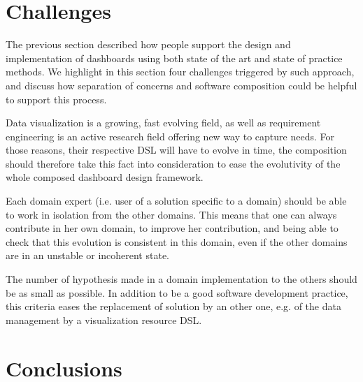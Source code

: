 \documentclass{acm_proc_article-sp}
\begin{document}
\section{Challenges}

The previous section described how people support the design and
implementation of dashboards using both state of the art and state of
practice methods. We highlight in this section four challenges
triggered by such approach, and discuss how separation of concerns and
software composition could be helpful to support this process.


Data visualization is a growing, fast evolving field, as well as
requirement engineering is an active research field offering new way
to capture needs.  For those reasons, their respective DSL will have
to evolve in time, the composition should therefore take this fact
into consideration to ease the evolutivity of the whole composed
dashboard design framework.

Each domain expert (i.e. user of a solution specific to a domain)
should be able to work in isolation from the other domains. This means
that one can always contribute in her own domain, to improve her
contribution, and being able to check that this evolution is
consistent in this domain, even if the other domains are in an
unstable or incoherent state.

The number of hypothesis made in a domain implementation to the others
should be as small as possible. In addition to be a good software
development practice, this criteria eases the replacement of solution
by an other one, e.g. of the data management by a visualization
resource DSL.


\section{Conclusions}

\end{document}
